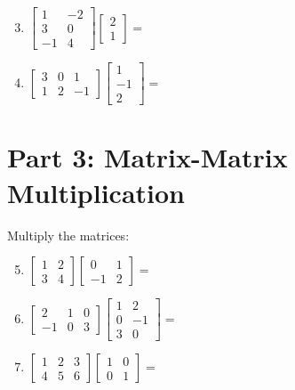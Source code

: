 \documentclass{article}
\begin{document}
\begin{enumerate}
\setcounter{enumi}{2}
\item $\begin{bmatrix} 1 & -2 \\ 3 & 0 \\ -1 & 4 \end{bmatrix} \begin{bmatrix} 2 \\ 1 \end{bmatrix} = $ \underline{\hspace{3cm}}

\item $\begin{bmatrix} 3 & 0 & 1 \\ 1 & 2 & -1 \end{bmatrix} \begin{bmatrix} 1 \\ -1 \\ 2 \end{bmatrix} = $ \underline{\hspace{3cm}}
\end{enumerate}

\section*{Part 3: Matrix-Matrix Multiplication}
Multiply the matrices:

\begin{enumerate}
\setcounter{enumi}{4}
\item $\begin{bmatrix} 1 & 2 \\ 3 & 4 \end{bmatrix} \begin{bmatrix} 0 & 1 \\ -1 & 2 \end{bmatrix} = $ \underline{\hspace{3cm}}

\item $\begin{bmatrix} 2 & 1 & 0 \\ -1 & 0 & 3 \end{bmatrix} \begin{bmatrix} 1 & 2 \\ 0 & -1 \\ 3 & 0 \end{bmatrix} = $ \underline{\hspace{3cm}}
	
\item $\begin{bmatrix} 1 & 2 & 3 \\ 4 & 5 & 6 \end{bmatrix} \begin{bmatrix} 1 & 0 \\ 0 & 1 \end{bmatrix} = $ \underline{\hspace{3cm}}
\end{enumerate}
\end{document}
